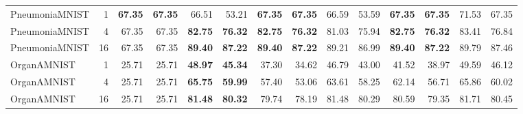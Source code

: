 \begin{table}[t]
\begin{tabular}{lrrrrrrrrrrrrr}
PneumoniaMNIST & 1 & \textbf{67.35} & \textbf{67.35} & 66.51 & 53.21 & \textbf{67.35} & \textbf{67.35} & 66.59 & 53.59 & \textbf{67.35} & \textbf{67.35} & 71.53 & 67.35 \\
PneumoniaMNIST & 4 & 67.35 & 67.35 & \textbf{82.75} & \textbf{76.32} & \textbf{82.75} & \textbf{76.32} & 81.03 & 75.94 & \textbf{82.75} & \textbf{76.32} & 83.41 & 76.84 \\
PneumoniaMNIST & 16 & 67.35 & 67.35 & \textbf{89.40} & \textbf{87.22} & \textbf{89.40} & \textbf{87.22} & 89.21 & 86.99 & \textbf{89.40} & \textbf{87.22} & 89.79 & 87.46 \\
OrganAMNIST & 1 & 25.71 & 25.71 & \textbf{48.97} & \textbf{45.34} & 37.30 & 34.62 & 46.79 & 43.00 & 41.52 & 38.97 & 49.59 & 46.12 \\
OrganAMNIST & 4 & 25.71 & 25.71 & \textbf{65.75} & \textbf{59.99} & 57.40 & 53.06 & 63.61 & 58.25 & 62.14 & 56.71 & 65.86 & 60.02 \\
OrganAMNIST & 16 & 25.71 & 25.71 & \textbf{81.48} & \textbf{80.32} & 79.74 & 78.19 & 81.48 & 80.29 & 80.59 & 79.35 & 81.71 & 80.45 \\
\bottomrule
\end{tabular}
\end{table}
